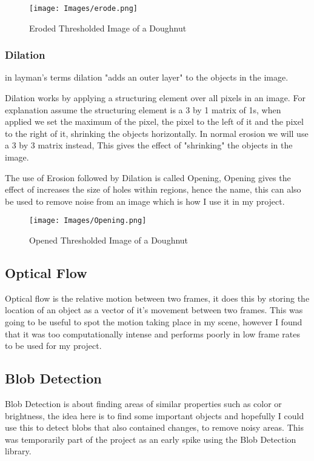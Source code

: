 \documentclass[a4paper]{report}
\begin{document}
\begin{figure}[!ht]
\centering
\texttt{[image: Images/erode.png]}
\caption{\label{fig:Doughnut} Eroded Thresholded Image of a Doughnut}
\end{figure}

\subsubsection{Dilation}
in layman's terms dilation "adds an outer layer" to the objects in the image.

Dilation works by applying a structuring element over all pixels in an image. For explanation assume the structuring element is a 3 by 1 matrix of 1s, when applied we set the maximum of the pixel, the pixel to the left of it and the pixel to the right of it, shrinking the objects horizontally. In normal erosion we will use a 3 by 3 matrix instead, This gives the effect of "shrinking" the objects in the image.

The use of Erosion followed by Dilation is called Opening, Opening gives the effect of increases the size of holes within regions, hence the name, this can also be used to remove noise from an image which is how I use it in my project.

\begin{figure}[!ht]
\centering
\texttt{[image: Images/Opening.png]}
\caption{\label{fig:Doughnut} Opened Thresholded Image of a Doughnut}
\end{figure}
\clearpage
\subsection{Optical Flow}
Optical flow is the relative motion between two frames, it does this by storing the location of an object as a vector of it's movement between two frames. This was going to be useful to spot the motion taking place in my scene, however I found that it was too computationally intense and performs poorly in low frame rates to be used for my project.

\subsection{Blob Detection}
Blob Detection is about finding areas of similar properties such as color or brightness, the idea here is to find some important objects and hopefully I could use this to detect blobs that also contained changes, to remove noisy areas. This was temporarily part of the project as an early spike using the Blob Detection library\cite{BLOB}.
\end{document}

